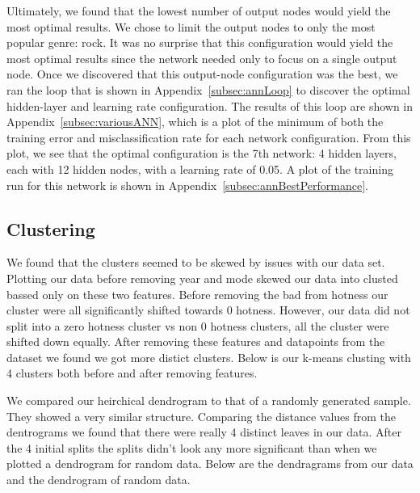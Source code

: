 \documentclass[12pt]{article}
\begin{document}
Ultimately, we found that the lowest number of output nodes would yield the most optimal results. We chose to limit the output nodes to only the most popular genre: rock. It was no surprise that this configuration would yield the most optimal results since the network needed only to focus on a single output node. Once we discovered that this output-node configuration was the best, we ran the loop that is shown in Appendix~\ref{subsec:annLoop} to discover the optimal hidden-layer and learning rate configuration. The results of this loop are shown in Appendix~\ref{subsec:variousANN}, which is a plot of the minimum of both the training error and misclassification rate for each network configuration. From this plot, we see that the optimal configuration is the 7th network: 4 hidden layers, each with 12 hidden nodes, with a learning rate of 0.05. A plot of the training run for this network is shown in Appendix~\ref{subsec:annBestPerformance}.


\subsection{Clustering}
\label{subsec:clusteringResults}
We found that the clusters seemed to be skewed by issues with our data set. Plotting our data before removing year and mode skewed our data into clusted bassed only on these two features. Before removing the bad from hotness our cluster were all significantly shifted towards 0 hotness. However, our data did not split into a zero hotness cluster vs non 0 hotness clusters, all the cluster were shifted down equally. After removing these features and datapoints from the dataset we found we got more distict clusters. Below is our k-means clusting with 4 clusters both before and after removing features.


We compared our heirchical dendrogram to that of a randomly generated sample. They showed a very similar structure. Comparing the distance values from the dentrograms we found that there were really 4 distinct leaves in our data. After the 4 initial splits the splits didn't look any more significant than when we plotted a dendrogram for random data. Below are the dendragrams from our data and the dendrogram of random data.



\end{document}
